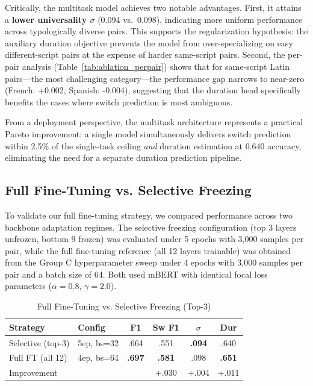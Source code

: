 \documentclass[sigconf,nonacm]{acmart}
\begin{document}
Critically, the multitask model achieves two notable advantages. First, it attains a \textbf{lower universality $\sigma$} (0.094 vs.\ 0.098), indicating more uniform performance across typologically diverse pairs. This supports the regularization hypothesis: the auxiliary duration objective prevents the model from over-specializing on easy different-script pairs at the expense of harder same-script pairs. Second, the per-pair analysis (Table~\ref{tab:ablation_perpair}) shows that for same-script Latin pairs---the most challenging category---the performance gap narrows to near-zero (French: +0.002, Spanish: -0.004), suggesting that the duration head specifically benefits the cases where switch prediction is most ambiguous.

From a deployment perspective, the multitask architecture represents a practical Pareto improvement: a single model simultaneously delivers switch prediction within 2.5\% of the single-task ceiling \textit{and} duration estimation at 0.640 accuracy, eliminating the need for a separate duration prediction pipeline.

\subsection{Full Fine-Tuning vs. Selective Freezing}
To validate our full fine-tuning strategy, we compared performance across two backbone adaptation regimes. The selective freezing configuration (top 3 layers unfrozen, bottom 9 frozen) was evaluated under 5 epochs with 3,000 samples per pair, while the full fine-tuning reference (all 12 layers trainable) was obtained from the Group C hyperparameter sweep under 4 epochs with 3,000 samples per pair and a batch size of 64. Both used mBERT with identical focal loss parameters ($\alpha=0.8$, $\gamma=2.0$).

\begin{table}[h]
\centering
\small
\caption{Full Fine-Tuning vs. Selective Freezing (Top-3)}
\label{tab:freeze_ablation}
\begin{tabular}{llcccc}
\toprule
\textbf{Strategy} & \textbf{Config} & \textbf{F1} & \textbf{Sw F1} & \textbf{$\sigma$} & \textbf{Dur} \\
\midrule
Selective (top-3) & 5ep, bs=32 & .664 & .551 & \textbf{.094} & .640 \\
Full FT (all 12) & 4ep, bs=64 & \textbf{.697} & \textbf{.581} & .098 & \textbf{.651} \\
\midrule
\multicolumn{3}{l}{Improvement} & +.030 & +.004 & +.011 \\
\bottomrule
\end{tabular}
\end{table}
\end{document}
